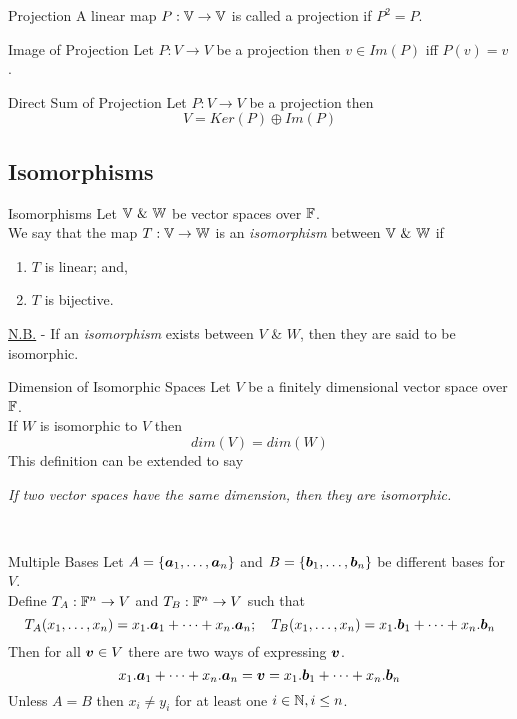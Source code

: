 \documentclass[11pt,a4paper]{article}
\begin{document}
\subtitle{Defintion 7.21 - }{Projection}
A linear map $P : \mathbb{V} \to \mathbb{V}$ is called a projection if $P^2 = P$.\\

\subtitle{Theorem 7.22 - }{Image of Projection}
Let $P : V \to V$ be a projection then $v \in Im(P)$ iff $P(v) = v$.\\

\subtitle{Theorem 7.23 - }{Direct Sum of Projection}
Let $P : V \to V$ be a projection then
$$V = Ker(P) \oplus Im(P)$$

\subsection{Isomorphisms}

\subtitle{Definition 7.24 -}{Isomorphisms}
Let $\mathbb{V}\ \&\ \mathbb{W}$ be vector spaces over $\mathbb{F}$. \\
We say that the map $T : \mathbb{V} \to \mathbb{W}$ is an \textit{isomorphism} between $\mathbb{V}\ \&\ \mathbb{W}$ if
\begin{enumerate}[label=\roman*)]
  \item $T$ is linear; and,
  \item $T$ is bijective.
\end{enumerate}
\underline{N.B.} - If an \textit{isomorphism} exists between $V$ \& $W$, then they are said to be isomorphic.\\

\subtitle{Theorem 7.25 - }{Dimension of Isomorphic Spaces}
Let $V$ be a finitely dimensional vector space over $\mathbb{F}$.\\
If $W$ is isomorphic to $V$ then $$dim(V) = dim(W)$$
This definition can be extended to say\\
\centerline{\textit{If two vector spaces have the same dimension, then they are isomorphic.}}\\

\subtitle{Proposition 7.26 - }{Multiple Bases}
Let $A = \{\boldsymbol{a}_1 , \dots , \boldsymbol{a}_n\}$ and $B = \{\boldsymbol{b}_1 , \dots , \boldsymbol{b}_n\}$ be different bases for $V$.\\
Define $T_A : \mathbb{F}^n \to V$ and $T_B : \mathbb{F}^n \to V$ such that
$$T_A(x_1, \dots , x_n) = x_1.\boldsymbol{a}_1 + \dots + x_n.\boldsymbol{a}_n; \quad T_B(x_1, \dots , x_n) = x_1.\boldsymbol{b}_1 + \dots + x_n.\boldsymbol{b}_n$$
Then for all $\boldsymbol{v} \in V$ there are two ways of expressing $\boldsymbol{v}$.
$$x_1.\boldsymbol{a}_1 + \dots + x_n.\boldsymbol{a}_n = \boldsymbol{v} = x_1.\boldsymbol{b}_1 + \dots + x_n.\boldsymbol{b}_n$$
Unless $A = B$ then $x_i \not = y_i$ for at least one $i \in \mathbb{N}, i \leq n$.\\
\end{document}
